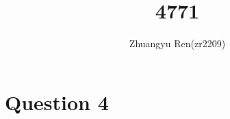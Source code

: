 \documentclass[12pt]{article}
\begin{document}
 
 
 
\title{4771}%
%
\author{Zhuangyu Ren(zr2209)\\ %
} %
 
\maketitle
 \indent 
\section*{Question 4}
\end{document}

